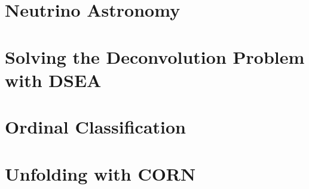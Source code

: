 
\chapter{Neutrino Astronomy} \label{sec:neutrino_astronomy}
  
  
  
\chapter{Solving the Deconvolution Problem with DSEA} \label{sec:dsea}
  
  
  
\chapter{Ordinal Classification} \label{sec:ordinal}
  
  
  
\chapter{Unfolding with CORN} \label{sec:unfolding}
  
  
  
  
  
  

